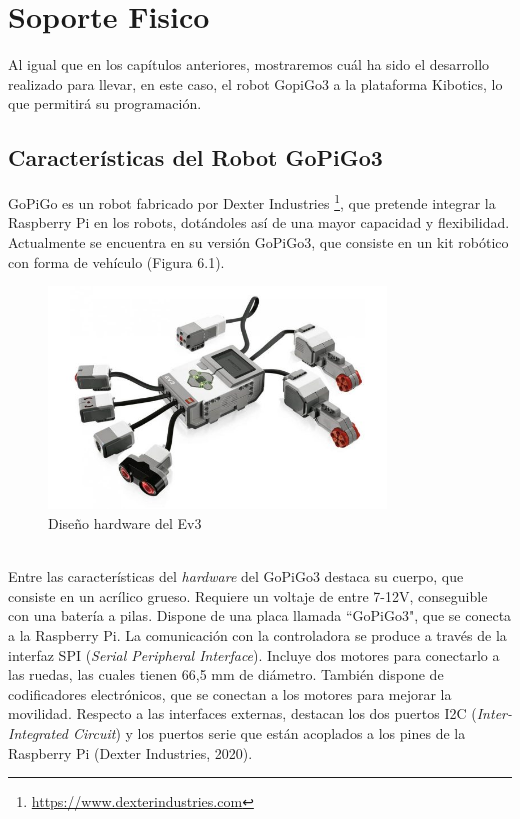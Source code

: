 \chapter{Soporte Fisico}

Al igual que en los capítulos anteriores, mostraremos cuál ha sido el desarrollo realizado para llevar, en este caso, el robot GopiGo3 a la plataforma Kibotics, lo que permitirá su programación.

\section{Características del Robot GoPiGo3}

GoPiGo es un robot fabricado por Dexter Industries \footnote{\url{https://www.dexterindustries.com}}, que pretende integrar la Raspberry Pi en los robots, dotándoles así de una mayor capacidad y flexibilidad. Actualmente se encuentra en su versión GoPiGo3, que consiste en un kit robótico con forma de vehículo (Figura 6.1).
\\
\begin{figure}[h!]
  \centering
    \includegraphics[width=0.8\textwidth]{img/motoresysensores.jpg}
  \caption{Diseño hardware del Ev3}
  \label{Diseño hardware del Ev3}
\end{figure}
\\
Entre las características del \textit{hardware} del GoPiGo3 destaca su cuerpo, que consiste en un acrílico grueso. Requiere un voltaje de entre 7-12V, conseguible con una batería a pilas. Dispone de una placa llamada “GoPiGo3", que se conecta a la Raspberry Pi. La comunicación con la controladora se produce a través de la interfaz SPI (\textit{Serial Peripheral Interface}). Incluye dos motores para conectarlo a las ruedas, las cuales tienen 66,5 mm de diámetro. También dispone de codificadores electrónicos, que se conectan a los motores para mejorar la movilidad. Respecto a las interfaces externas, destacan los dos puertos I2C (\textit{Inter-Integrated Circuit}) y los puertos serie que están acoplados a los pines de la Raspberry Pi (Dexter Industries, 2020).
